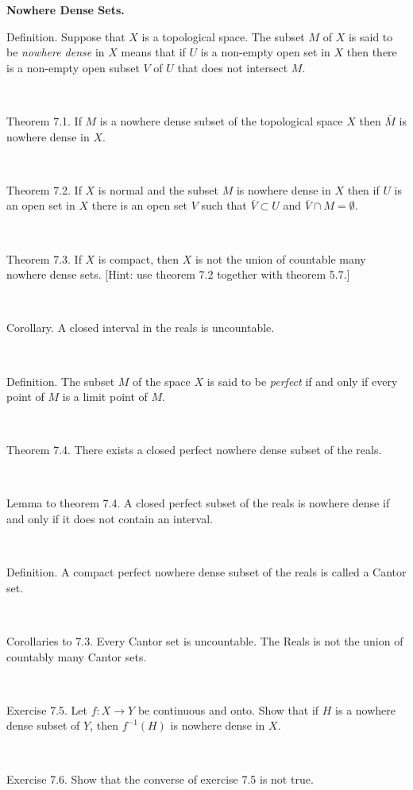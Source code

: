 \documentclass[12pt, std]{article}
\begin{document}
\begin{center} \textbf{Nowhere Dense Sets.} \end{center}

Definition.  Suppose that $X$ is a topological space.  The subset
$M$ of $X$ is said to be \textit{nowhere dense} in $X$ means that if
$U$ is a non-empty open set in $X$ then there is a non-empty open
subset $V$ of $U$ that does not intersect $M$.

\

Theorem 7.1.  If $M$ is a nowhere dense subset of the topological
space $X$ then $\overline{M}$ is nowhere dense in $X$.

\

Theorem 7.2.  If $X$ is normal and the subset $M$ is nowhere dense
in $X$ then if $U$ is an open set in $X$ there is an open set $V$
such that $\overline{V} \subset U$ and $ \overline{V} \cap M
=\emptyset$.

\

Theorem 7.3.  If $X$ is compact, then $X$ is not the union of
countable many nowhere dense sets.  [Hint: use theorem 7.2 together
with theorem 5.7.]

\

Corollary.  A closed interval in the reals is uncountable.

\

Definition.  The subset $M$ of the space $X$ is said to be
\textit{perfect} if and only if every point of $M$ is a limit point
of $M$.

\

Theorem 7.4.  There exists a closed perfect nowhere dense subset of
the reals.

\

Lemma to theorem 7.4.  A closed perfect subset of the reals is
nowhere dense if and only if it does not contain an interval.

\

Definition.  A compact perfect nowhere dense subset of the reals is
called a Cantor set.

\

Corollaries to 7.3.  Every Cantor set is uncountable.  The Reals is
not the union of countably many Cantor sets.

\

Exercise 7.5.  Let $f: X \rightarrow Y$ be continuous and onto. Show
that if $H$ is a nowhere dense subset of $Y$, then $f^{-1}(H)$ is
nowhere dense in $X$.

\

Exercise 7.6.  Show that the converse of exercise 7.5 is not true.
\end{document}
